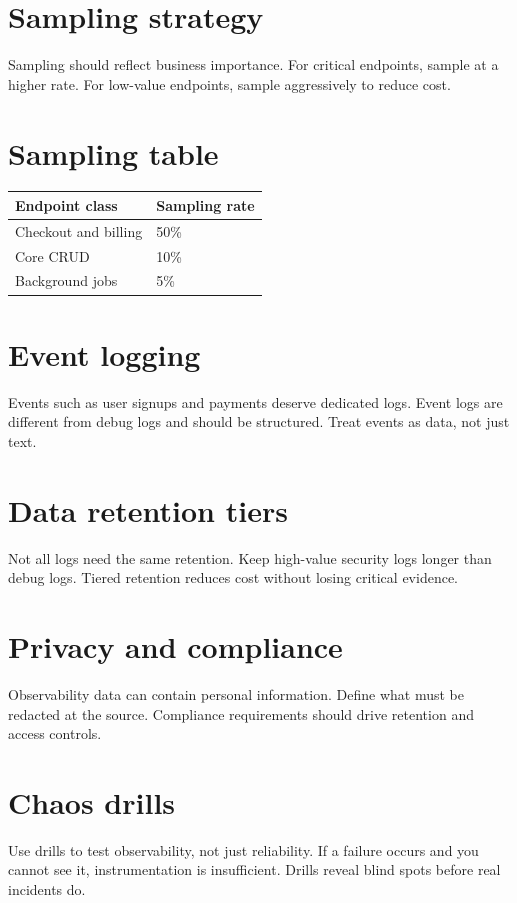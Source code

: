 \section{Sampling strategy}
Sampling should reflect business importance.
For critical endpoints, sample at a higher rate.
For low-value endpoints, sample aggressively to reduce cost.

\section{Sampling table}
\begin{tabularx}{\textwidth}{@{}lX@{}}
\toprule
Endpoint class & Sampling rate \\
\midrule
Checkout and billing & 50\% \\
Core CRUD & 10\% \\
Background jobs & 5\% \\
\bottomrule
\end{tabularx}

\section{Event logging}
Events such as user signups and payments deserve dedicated logs.
Event logs are different from debug logs and should be structured.
Treat events as data, not just text.

\section{Data retention tiers}
Not all logs need the same retention.
Keep high-value security logs longer than debug logs.
Tiered retention reduces cost without losing critical evidence.

\section{Privacy and compliance}
Observability data can contain personal information.
Define what must be redacted at the source.
Compliance requirements should drive retention and access controls.

\section{Chaos drills}
Use drills to test observability, not just reliability.
If a failure occurs and you cannot see it, instrumentation is insufficient.
Drills reveal blind spots before real incidents do.


